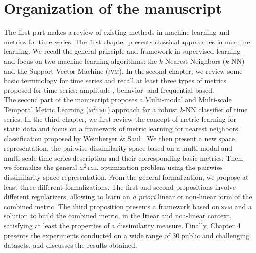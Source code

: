 
\section*{Organization of the manuscript}
\indent The first part makes a review of existing methods in machine learning and metrics for time series. The first chapter presents classical approaches in machine learning. We recall the general principle and framework in supervised learning and focus on two machine learning algorithms: the $k$-Nearest Neighbors ($k$-NN) and the Support Vector Machine (\textsc{svm}). In the second chapter, we review some basic terminology for time series and recall at least three types of metrics proposed for time series: amplitude-, behavior- and frequential-based. \\
\noindent The second part of the manuscript proposes a Multi-modal and Multi-scale Temporal Metric Learning (\textsc{m$^2$tml}) approach for a robust $k$-NN classifier of time series. In the third chapter, we first review the concept of metric learning for static data and focus on a framework of metric learning for nearest neighbors classification proposed by Weinberger \& Saul \cite{Weinberger2009}. We then present a new space representation, the pairwise dissimilarity space based on a multi-modal and multi-scale time series description and their corresponding basic metrics. Then, we formalize the general \textsc{m$^2$tml} optimization problem using the pairwise dissimilarity space representation. From the general formalization, we propose at least three different formalizations. The first and second propositions involve different regularizers, allowing to learn an \textit{a priori} linear or non-linear form of the combined metric. The third proposition presents a framework based on \textsc{svm} and a solution to build the combined metric, in the linear and non-linear context, satisfying at least the properties of a dissimilarity measure. Finally, Chapter 4 presents the experiments conducted on a wide range of 30 public and challenging datasets, and discusses the results obtained.

